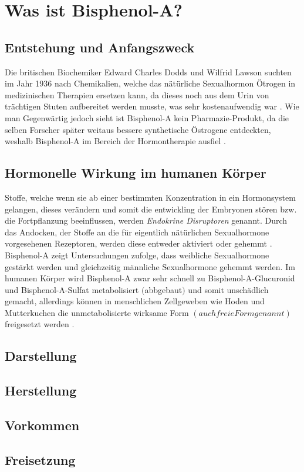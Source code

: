 \section{Was ist Bisphenol-A?}
\subsection{Entstehung und Anfangszweck}
Die britischen Biochemiker Edward Charles Dodds und Wilfrid Lawson suchten 
im Jahr 1936 nach Chemikalien, welche das nätürliche Sexualhormon Ötrogen in medizinischen 
Therapien ersetzen kann, da dieses noch aus dem Urin von trächtigen Stuten 
aufbereitet werden musste, was sehr kostenaufwendig war \cite[]{Umweltbundesamt2010}. 
Wie man Gegenwärtig jedoch sieht ist Bisphenol-A kein Pharmazie-Produkt, da die selben Forscher
später weitaus bessere synthetische Östrogene entdeckten, weshalb Bisphenol-A im Bereich
der Hormontherapie ausfiel \cite{Wikipedia}. 

\subsection{Hormonelle Wirkung im humanen Körper}
Stoffe, welche wenn sie ab einer bestimmten Konzentration in ein Hormonsystem gelangen,
dieses verändern und somit die entwickling der Embryonen stören bzw. die Fortpflanzung
beeinflussen, werden \textit{Endokrine Disruptoren} genannt.
Durch das Andocken, der Stoffe an die für eigentlich nätürlichen Sexualhormone 
vorgesehenen Rezeptoren, werden diese entweder aktiviert oder gehemmt \cite{Umweltbundesamt2010}.
Bisphenol-A zeigt Untersuchungen zufolge, dass weibliche Sexualhormone gestärkt werden und 
gleichzeitig männliche Sexualhormone gehemmt werden.
Im humanen Körper wird Bisphenol-A zwar sehr schnell zu Bisphenol-A-Glucuronid und 
Bisphenol-A-Sulfat metabolisiert $($abbgebaut$)$ und somit unschädlich gemacht, allerdings
können in menschlichen Zellgeweben wie Hoden und Mutterkuchen die unmetabolisierte wirksame
Form $(auch freie Form genannt)$ freigesetzt werden \cite{Umweltbundesamt2010}.

\subsection{Darstellung}
\subsection{Herstellung}
\subsection{Vorkommen}
\subsection{Freisetzung}
